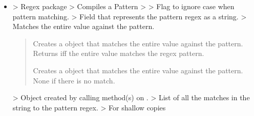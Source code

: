 \documentclass[letterpaper,10pt,english]{sphinxmanual}
\begin{document}
\begin{description}
\begin{itemize}
\item {} \begin{description}
\sphinxAtStartPar
{}           \sphinxhyphen{}\textgreater{}                      Regex package
           \sphinxhyphen{}\textgreater{}            Compiles a Pattern
             \sphinxhyphen{}\textgreater{}  
  \sphinxhyphen{}\textgreater{}           Flag to ignore case when pattern matching.
           \sphinxhyphen{}\textgreater{}         Field that represents the pattern regex as a string.
  \sphinxhyphen{}\textgreater{}          Matches the entire value against the pattern.
\begin{quote}
\begin{description}
\sphinxAtStartPar
{}    Creates a  object that matches the entire value against the pattern.
                 Returns  iff the entire value matches the regex pattern.

\sphinxAtStartPar
{}       Creates a    object that matches the entire value against the pattern. None if there is no match.

\end{description}
\end{quote}

\sphinxAtStartPar
{}             \sphinxhyphen{}\textgreater{}                Object created by calling method(s) on .
          \sphinxhyphen{}\textgreater{}          List of all the matches in the string to the pattern regex.
  \sphinxhyphen{}\textgreater{}             For shallow copies

\end{description}

\end{itemize}

\end{description}
\end{document}
